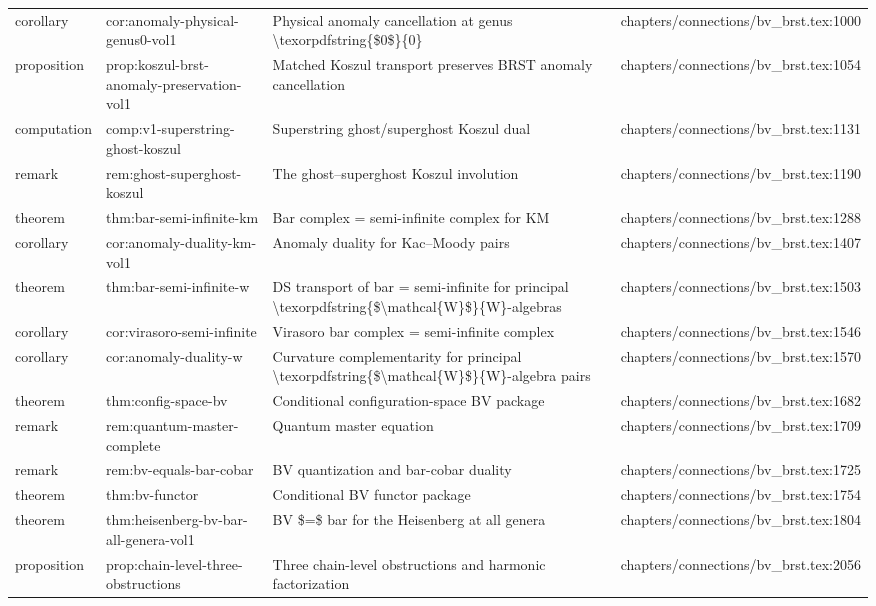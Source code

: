 \documentclass[11pt]{article}
\begin{document}
\begin{longtable}{L{0.10\textwidth}L{0.26\textwidth}L{0.42\textwidth}L{0.22\textwidth}}
corollary & cor:anomaly-physical-genus0-vol1 & Physical anomaly cancellation at genus \textbackslash{}texorpdfstring\{\$0\$\}\{0\} & chapters/connections/bv\_brst.tex:1000\\
proposition & prop:koszul-brst-anomaly-preservation-vol1 & Matched Koszul transport preserves BRST anomaly cancellation & chapters/connections/bv\_brst.tex:1054\\
computation & comp:v1-superstring-ghost-koszul & Superstring ghost/superghost Koszul dual & chapters/connections/bv\_brst.tex:1131\\
remark & rem:ghost-superghost-koszul & The ghost--superghost Koszul involution & chapters/connections/bv\_brst.tex:1190\\
theorem & thm:bar-semi-infinite-km & Bar complex = semi-infinite complex for KM & chapters/connections/bv\_brst.tex:1288\\
corollary & cor:anomaly-duality-km-vol1 & Anomaly duality for Kac--Moody pairs & chapters/connections/bv\_brst.tex:1407\\
theorem & thm:bar-semi-infinite-w & DS transport of bar = semi-infinite for principal \textbackslash{}texorpdfstring\{\$\textbackslash{}mathcal\{W\}\$\}\{W\}-algebras & chapters/connections/bv\_brst.tex:1503\\
corollary & cor:virasoro-semi-infinite & Virasoro bar complex = semi-infinite complex & chapters/connections/bv\_brst.tex:1546\\
corollary & cor:anomaly-duality-w & Curvature complementarity for principal \textbackslash{}texorpdfstring\{\$\textbackslash{}mathcal\{W\}\$\}\{W\}-algebra pairs & chapters/connections/bv\_brst.tex:1570\\
theorem & thm:config-space-bv & Cond{}itional configuration-space BV package & chapters/connections/bv\_brst.tex:1682\\
remark & rem:quantum-master-complete & Quantum master equation & chapters/connections/bv\_brst.tex:1709\\
remark & rem:bv-equals-bar-cobar & BV quantization and bar-cobar duality & chapters/connections/bv\_brst.tex:1725\\
theorem & thm:bv-functor & Cond{}itional BV functor package & chapters/connections/bv\_brst.tex:1754\\
theorem & thm:heisenberg-bv-bar-all-genera-vol1 & BV \$=\$ bar for the Heisenberg at all genera & chapters/connections/bv\_brst.tex:1804\\
proposition & prop:chain-level-three-obstructions & Three chain-level obstructions and harmonic factorization & chapters/connections/bv\_brst.tex:2056\\

\end{longtable}
\end{document}
